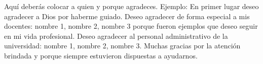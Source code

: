 \begin{agradecimientos}
Aquí deberás colocar a quien y porque agradeces. Ejemplo:
En primer lugar deseo agradecer a Dios por haberme guiado.
Deseo agradecer de forma especial a mis docentes: nombre 1, nombre 2, nombre 3 porque fueron ejemplos que deseo seguir en mi vida profesional.
Deseo agradecer al personal administrativo de la universidad: nombre 1, nombre 2, nombre 3. Muchas gracias por la atención brindada y porque siempre estuvieron dispuestas a ayudarnos.
\end{agradecimientos}
